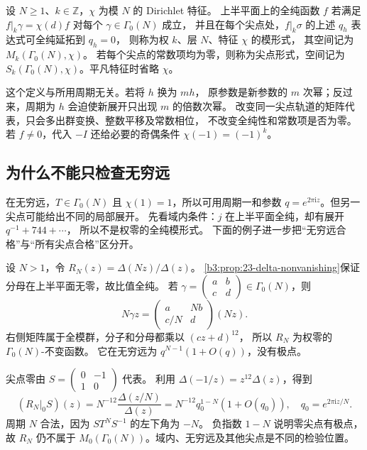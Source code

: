 \begin{definition}[层、特征与尖点条件]\label{b3:def:E-level-form}
设 \(N\ge1\)、\(k\in\mathbb Z\)，\(\chi\) 为模 \(N\) 的 Dirichlet 特征。
上半平面上的全纯函数 \(f\) 若满足
\(f|_k\gamma=\chi(d)f\) 对每个 \(\gamma\in\Gamma_0(N)\) 成立，
并且在每个尖点处，\(f|_k\sigma\) 的上述 \(q_h\) 表达式可全纯延拓到 \(q_h=0\)，
则称为权 \(k\)、层 \(N\)、特征 \(\chi\) 的模形式，
其空间记为 \(M_k(\Gamma_0(N),\chi)\)。
若每个尖点的常数项均为零，则称为尖点形式，空间记为
\(S_k(\Gamma_0(N),\chi)\)。平凡特征时省略 \(\chi\)。
\end{definition}
这个定义与所用周期无关。若将 \(h\) 换为 \(mh\)，
原参数是新参数的 \(m\) 次幂；反过来，周期为 \(h\) 会迫使新展开只出现 \(m\) 的倍数次幂。
改变同一尖点轨道的矩阵代表，只会多出群变换、整数平移及常数相位，
不改变全纯性和常数项是否为零。
若 \(f\ne0\)，代入 \(-I\) 还给必要的奇偶条件
\(\chi(-1)=(-1)^k\)。

\subsection{为什么不能只检查无穷远}
\label{b3:subsec:E0103}

在无穷远，\(T\in\Gamma_0(N)\) 且 \(\chi(1)=1\)，所以可用周期一和参数
\(q=e^{2\pi\mathrm i z}\)。但另一尖点可能给出不同的局部展开。
先看域内条件：\(j\) 在上半平面全纯，却有展开 \(q^{-1}+744+\cdots\)，
所以不是权零的全纯模形式。
下面的例子进一步把“无穷远合格”与“所有尖点合格”区分开。

\ProseParagraphBreak

设 \(N>1\)，令 \(R_N(z)=\Delta(Nz)/\Delta(z)\)。
\cref{b3:prop:23-delta-nonvanishing}保证分母在上半平面无零，故比值全纯。
若 \(\gamma=\left(\begin{smallmatrix}a&b\\c&d\end{smallmatrix}\right)\in\Gamma_0(N)\)，则
\[
 N\gamma z=
 \begin{pmatrix}a&Nb\\c/N&d\end{pmatrix}(Nz).
\]
右侧矩阵属于全模群，分子和分母都乘以 \((cz+d)^{12}\)，
所以 \(R_N\) 为权零的 \(\Gamma_0(N)\)-不变函数。
它在无穷远为 \(q^{N-1}(1+O(q))\)，没有极点。

\ProseParagraphBreak

尖点零由 \(S=\left(\begin{smallmatrix}0&-1\\1&0\end{smallmatrix}\right)\) 代表。
利用 \(\Delta(-1/z)=z^{12}\Delta(z)\)，得到
\[
 (R_N|_0S)(z)=N^{-12}\frac{\Delta(z/N)}{\Delta(z)}
       =N^{-12}q_0^{1-N}(1+O(q_0)),
 \quad q_0=e^{2\pi\mathrm i z/N}.
\]
周期 \(N\) 合法，因为 \(ST^NS^{-1}\) 的左下角为 \(-N\)。
负指数 \(1-N\) 说明零尖点有极点，故 \(R_N\) 仍不属于
\(M_0(\Gamma_0(N))\)。域内、无穷远及其他尖点是不同的检验位置。

